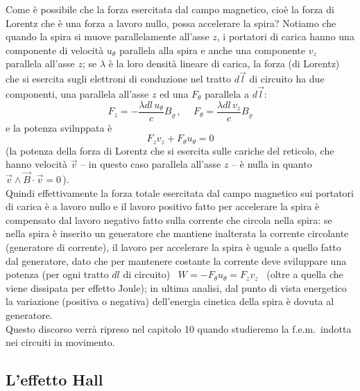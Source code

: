 Come \`e possibile che la forza esercitata dal campo magnetico, cio\`e la forza
di Lorentz che \`e una forza a lavoro nullo, possa accelerare la spira? Notiamo
che quando la spira si muove parallelamente all'asse $z$, i portatori di carica
hanno una componente di velocit\`a $u_\theta$ parallela alla spira e anche una
componente $v_z$ parallela all'asse $z$; se $\lambda$ \`e la loro densit\`a
lineare di carica, la forza (di Lorentz) che si esercita sugli elettroni di
conduzione nel tratto $d\vec l$ di circuito ha due componenti, una parallela
all'asse $z$ ed una $F_\theta$ parallela a $d\vec l$:
\begin{equation}
  F_z=-\frac{\lambda dl\,u_\theta}{c}B_\varrho\,,
  \quad\ F_\theta=\frac{\lambda dl\,v_z}{c}B_\varrho
  \tag{7.63}
\end{equation}
e la potenza sviluppata \`e
\begin{equation}
  F_zv_z+F_\theta u_\theta=0
  \tag{7.64}
\end{equation}
(la potenza della forza di Lorentz che si esercita sulle cariche del reticolo,
che hanno velocit\`a $\vec v$ -- in questo caso parallela all'asse $z$ -- \`e
nulla in quanto \ $\vec v\wedge\vec B\cdot\vec v=0$\,).\\
Quindi effettivamente la forza totale esercitata dal campo magnetico sui
portatori di carica \`e a lavoro nullo e il lavoro positivo fatto per accelerare
la spira \`e compensato dal lavoro negativo fatto sulla corrente che circola
nella spira: se nella spira \`e inserito
un generatore che mantiene inalterata la corrente circolante (generatore di
corrente), il lavoro per accelerare la spira \`e uguale a quello fatto dal
generatore, dato che per mantenere costante la corrente deve sviluppare una
potenza (per ogni tratto $dl$ di circuito) \ $W=-F_\theta u_\theta=F_zv_z$
\ (oltre a quella che viene dissipata per effetto Joule); in ultima analisi, dal
punto di vista energetico la variazione (positiva o negativa) dell'energia
cinetica della spira \`e dovuta al generatore.\\
Questo discorso verr\`a ripreso nel capitolo 10 quando studieremo la
f.e.m.\ indotta nei circuiti in movimento.

\subsection{L'effetto Hall}

